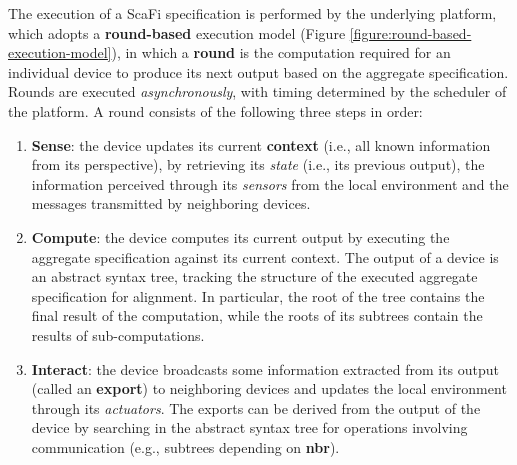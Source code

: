 The execution of a \ac{ScaFi} specification is performed by the underlying
platform, which adopts a \textbf{round-based} execution model (Figure
\ref{figure:round-based-execution-model}), in which a \textbf{round} is the
computation required for an individual device to produce its next output based
on the aggregate specification. Rounds are executed \textit{asynchronously},
with timing determined by the scheduler of the platform. A round consists of
the following three steps in order:
\begin{enumerate}
  \item \textbf{Sense}: the device updates its current \textbf{context} (i.e.,
        all known information from its perspective), by retrieving its
        \textit{state} (i.e., its previous output), the information perceived
        through its \textit{sensors} from the
        local environment and the messages transmitted by neighboring devices.
  \item \textbf{Compute}: the device computes its current output by executing
        the aggregate specification against its current context. The output of
        a device is an abstract syntax tree, tracking the structure of the
        executed aggregate specification for alignment. In particular, the root
        of the tree contains the final result of the computation, while the
        roots of its subtrees contain the results of sub-computations.
  \item \textbf{Interact}: the device broadcasts some information extracted
        from its output (called an \textbf{export}) to neighboring devices and
        updates the local environment through its \textit{actuators}. The
        exports can be derived from the output of the device by searching in the
        abstract syntax tree for operations involving communication (e.g.,
        subtrees depending on \textbf{nbr}).
\end{enumerate}

